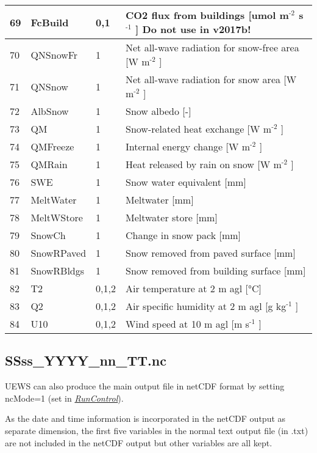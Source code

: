 \documentclass[letterpaper,10pt,english]{sphinxmanual}
\begin{document}
\begin{savenotes}
\begin{longtable}{|l|l|l|l|}
\\
\hline
69
&
FcBuild
&
0,1
&
CO2 flux from buildings {[}umol m$^{\text{-2}}$ s$^{\text{-1}}$ {]} Do not use in v2017b!
\\
\hline
70
&
QNSnowFr
&
1
&
Net all-wave radiation for snow-free area {[}W m$^{\text{-2}}$ {]}
\\
\hline
71
&
QNSnow
&
1
&
Net all-wave radiation for snow area {[}W m$^{\text{-2}}$ {]}
\\
\hline
72
&
AlbSnow
&
1
&
Snow albedo {[}-{]}
\\
\hline
73
&
QM
&
1
&
Snow-related heat exchange {[}W m$^{\text{-2}}$ {]}
\\
\hline
74
&
QMFreeze
&
1
&
Internal energy change {[}W m$^{\text{-2}}$ {]}
\\
\hline
75
&
QMRain
&
1
&
Heat released by rain on snow {[}W m$^{\text{-2}}$ {]}
\\
\hline
76
&
SWE
&
1
&
Snow water equivalent {[}mm{]}
\\
\hline
77
&
MeltWater
&
1
&
Meltwater {[}mm{]}
\\
\hline
78
&
MeltWStore
&
1
&
Meltwater store {[}mm{]}
\\
\hline
79
&
SnowCh
&
1
&
Change in snow pack {[}mm{]}
\\
\hline
80
&
SnowRPaved
&
1
&
Snow removed from paved surface {[}mm{]}
\\
\hline
81
&
SnowRBldgs
&
1
&
Snow removed from building surface {[}mm{]}
\\
\hline
82
&
T2
&
0,1,2
&
Air temperature at 2 m agl {[}°C{]}
\\
\hline
83
&
Q2
&
0,1,2
&
Air specific humidity at 2 m agl {[}g kg$^{\text{-1}}$ {]}
\\
\hline
84
&
U10
&
0,1,2
&
Wind speed at 10 m agl {[}m s$^{\text{-1}}$ {]}
\\
\hline
\end{longtable}\sphinxatlongtableend\end{savenotes}


\subsection{SSss\_YYYY\_nn\_TT.nc}
\label{\detokenize{output_files/output_files:ssss-yyyy-nn-tt-nc}}
UEWS can also produce the main output file in netCDF format by setting ncMode=1 (set in {\hyperref[\detokenize{output_files/output_files:RunControl}]{\emph{RunControl}}}).

As the date and time information is incorporated in the netCDF output as
separate dimension, the first five variables in the normal text output
file (in .txt) are not included in the netCDF output but other variables
are all kept.
\end{document}
